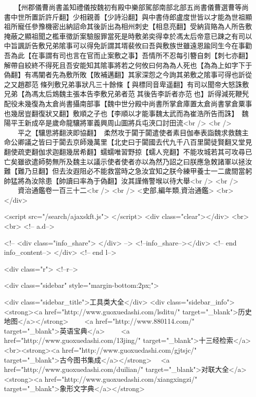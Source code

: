 　　【州郡儀曹尚書盖知禮儀按魏初有殿中樂部駕部南部北部五尚書儀曹選曹等尚書中世所置訢許斤翻】少相親善【少詩沿翻】與中書侍郎盧度世皆以才能為世祖顯祖所寵任參豫機密出納詔命其後訢出為相州刺史【相息亮翻】受納貨賂為人所告敷掩蔽之顯祖聞之檻車徵訢案驗服罪當死是時敷弟奕得幸於馮太后帝意已踈之有司以中旨諷訢告敷兄弟隂事可以得免訢謂其壻裴攸曰吾與敷族世雖遠恩踰同生今在事勸吾為此【在事謂有司也言在官而止案敷之事】吾情所不忍每引簪自刺【刺七亦翻】解帶自絞終不得死且吾安能知其隂事將若之何攸曰何為為人死也【為為上如字下于偽翻】有馮闡者先為敷所敗【敗補邁翻】其家深怨之今詢其弟敷之隂事可得也訢從之又趙郡范條列敷兄弟事狀凡三十餘條【與標同音卑遥翻】有司以聞帝大怒誅敷兄弟【為馮太后鴆魏主張本告李敷兄弟者范其後告李訢者亦范也】訢得減死鞭髠配役未幾復為太倉尚書攝南部事【魏中世分殿中尚書所掌倉庫置太倉尚書掌倉粟事也幾居豈翻復狀又翻】敷順之子也【李順以才能事魏太武而為崔浩所告而誅】　魏陽平王新成卒是歲命龍驤將軍義興周山圖將兵屯浹口討田流<br />
<br />
　　平之【驤思將翻浹即協翻】　柔然攻于闐于闐遣使者素目伽奉表詣魏求救魏主命公卿議之皆曰于闐去京師幾萬里【北史曰于闐國去代九千八百里闐徒賢翻又堂見翻使疏吏翻伽求迦翻幾居希翻】蠕蠕唯習野掠【蠕人兖翻】不能攻城若其可攻尋已亡矣雖欲遣師勢無所及魏主以議示使者使者亦以為然乃詔之曰朕應急敇諸軍以拯汝難【難乃旦翻】但去汝遐阻必不能救當時之急汝宜知之朕今練甲養士一二歲間當躬帥猛將為汝除患【帥讀曰率為于偽翻】汝其謹脩警堠以待大舉<br />
<br />
　　資治通鑑卷一百三十二<br />
<br />
<史部,編年類,資治通鑑>  <br>
   </div> 

<script src="/search/ajaxskft.js"> </script>
 <div class="clear"></div>
<br>
<br>
 <!-- a.d-->

 <!--
<div class="info_share">
</div> 
-->
 <!--info_share--></div>   <!-- end info_content-->
  </div> <!-- end l-->

<div class="r">   <!--r-->



<div class="sidebar"  style="margin-bottom:2px;">

 
<div class="sidebar_title">工具类大全</div>
<div class="sidebar_info">
<strong><a href="http://www.guoxuedashi.com/lsditu/" target="_blank">历史地图</a></strong>　　
<a href="http://www.880114.com/" target="_blank">英语宝典</a>　　
<a href="http://www.guoxuedashi.com/13jing/" target="_blank">十三经检索</a>　
<br><strong><a href="http://www.guoxuedashi.com/gjtsjc/" target="_blank">古今图书集成</a></strong>　
<a href="http://www.guoxuedashi.com/duilian/" target="_blank">对联大全</a>　<strong><a href="http://www.guoxuedashi.com/xiangxingzi/" target="_blank">象形文字典</a></strong>　

